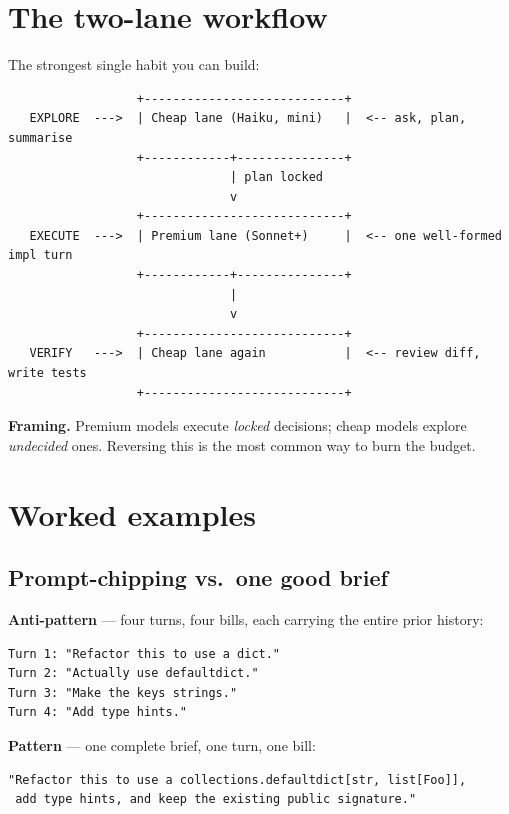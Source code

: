 \documentclass[11pt,a4paper]{article}
\begin{document}
\section{The two-lane workflow}\label{sec:twolane}

The strongest single habit you can build:

\begin{lstlisting}
                  +----------------------------+
   EXPLORE  --->  | Cheap lane (Haiku, mini)   |  <-- ask, plan, summarise
                  +------------+---------------+
                               | plan locked
                               v
                  +----------------------------+
   EXECUTE  --->  | Premium lane (Sonnet+)     |  <-- one well-formed impl turn
                  +------------+---------------+
                               |
                               v
                  +----------------------------+
   VERIFY   --->  | Cheap lane again           |  <-- review diff, write tests
                  +----------------------------+
\end{lstlisting}

\noindent\textbf{Framing.} Premium models execute \emph{locked} decisions; cheap models explore \emph{undecided} ones. Reversing this is the most common way to burn the budget.

\section{Worked examples}\label{sec:worked}

\subsection*{Prompt-chipping vs.\ one good brief}

\noindent\textbf{Anti-pattern} --- four turns, four bills, each carrying the entire prior history:

\begin{lstlisting}
Turn 1: "Refactor this to use a dict."
Turn 2: "Actually use defaultdict."
Turn 3: "Make the keys strings."
Turn 4: "Add type hints."
\end{lstlisting}

\noindent\textbf{Pattern} --- one complete brief, one turn, one bill:

\begin{lstlisting}
"Refactor this to use a collections.defaultdict[str, list[Foo]],
 add type hints, and keep the existing public signature."
\end{lstlisting}
\end{document}
